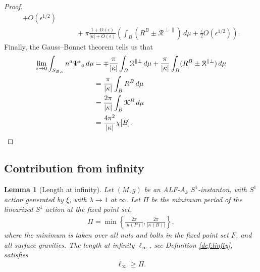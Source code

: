 \documentclass[a4paper,10pt,reqno]{amsart}
\newcommand{\nut}{P}
\newcommand{\bolt}{B}
\newcommand{\cR}{\mathcal{R}}
\theoremstyle{plain}
\newtheorem{lemma}[thm]{Lemma}
\newcommand{\PM}[1]{{{#1}^{\hspace{-.5pt}\scaleto{\pm}{3.5pt}}}}
\newcommand{\eps}{\epsilon}
\numberwithin{equation}{section}
\begin{document}
\begin{proof}
\begin{align}
+ O(\epsilon^{1/2})
\nonumber \\
&\qquad
+ \pi\frac{1 + O(\epsilon)}{|\kappa| + O(\epsilon)}
\left(
\int_\bolt
( R^\bolt \pm \cR^{\perp\parallel} ) \, d\mu
+ \frac{\epsilon}{2} O(\epsilon^{1/2})
\right).
\end{align}
Finally, the Gauss--Bonnet theorem tells us that
\begin{align}
\lim_{\eps \to 0} 
\int_{S_{\bolt,\epsilon}} n^a \PM\Psi_a \, d\mu
&=
\mp \frac{\pi}{|\kappa|} \int_\bolt \cR^{\parallel\perp} \, d\mu
+ \frac{\pi}{|\kappa|} 
\int_\bolt (R^\bolt \pm \cR^{\parallel\perp}) \, d\mu \nonumber \\
&= \frac{\pi}{|\kappa|} \int_\bolt R^\bolt \, d\mu \nonumber \\
&= \frac{2\pi}{|\kappa|} \int_\bolt \mathcal{K}^\bolt \, d\mu \nonumber \\
&= \frac{4\pi^2}{|\kappa|} \chi[\bolt]. 
\end{align}
\end{proof} 


\subsection{Contribution from infinity} \label{sec:infterm}

\begin{lemma}[Length at infinity] \label{lem:ellinfty} 
Let $(M,g)$ be an ALF-$A_k$ $S^1$-instanton, with $S^1$ action generated by $\xi$, with $\lambda \to 1$ at $\infty$. 
Let  $\Pi$ be the minimum period of the linearized $S^1$ action at the fixed point set, 
\begin{align} \label{eq:Pi-ineq}
\Pi = \min \left \{ \frac{2\pi}{|\kappa(\nut)|}, \frac{2\pi}{|\kappa(\bolt)|} \right \},  
\end{align} 
where the minimum is taken over all nuts and bolts in the fixed point set $F$, and all surface gravities. 
The length at infinity $\ell_\infty$, see Definition \ref{def:linfty}, satisfies 
\begin{align} \label{eq:ellinfty}
\ell_\infty \geq \Pi. 
\end{align} 
\end{lemma} 
\end{document}
